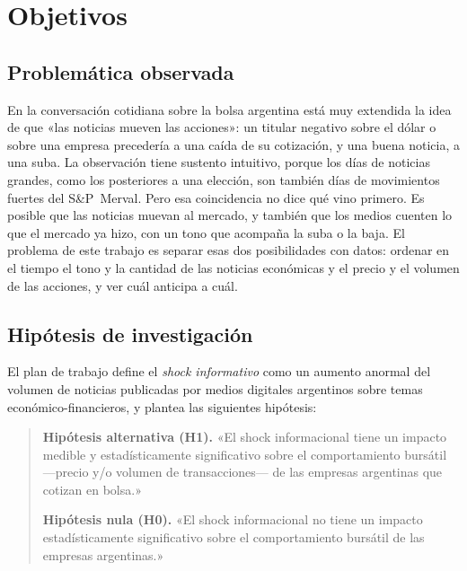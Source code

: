 \chapter{Objetivos}
\label{cap:objetivos}

\section{Problemática observada}

En la conversación cotidiana sobre la bolsa argentina está muy extendida la idea de que «las
noticias mueven las acciones»: un titular negativo sobre el dólar o sobre una empresa
precedería a una caída de su cotización, y una buena noticia, a una suba. La observación tiene
sustento intuitivo, porque los días de noticias grandes, como los posteriores a una elección,
son también días de movimientos fuertes del S\&P~Merval. Pero esa coincidencia no dice qué
vino primero. Es posible que las noticias muevan al mercado, y también que los medios cuenten
lo que el mercado ya hizo, con un tono que acompaña la suba o la baja. El problema de este
trabajo es separar esas dos posibilidades con datos: ordenar en el tiempo el tono y la
cantidad de las noticias económicas y el precio y el volumen de las acciones, y ver cuál
anticipa a cuál.

\section{Hipótesis de investigación}

El plan de trabajo define el \textit{shock informativo} como un aumento anormal del volumen
de noticias publicadas por medios digitales argentinos sobre temas económico-financieros, y
plantea las siguientes hipótesis:

\begin{quote}
\textbf{Hipótesis alternativa (H1).} «El shock informacional tiene un impacto medible y
estadísticamente significativo sobre el comportamiento bursátil —precio y/o volumen de
transacciones— de las empresas argentinas que cotizan en bolsa.»

\textbf{Hipótesis nula (H0).} «El shock informacional no tiene un impacto estadísticamente
significativo sobre el comportamiento bursátil de las empresas argentinas.»
\end{quote}

